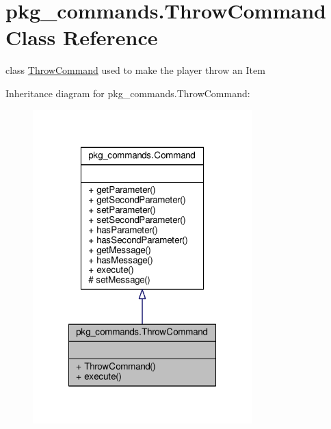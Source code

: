 \hypertarget{classpkg__commands_1_1ThrowCommand}{\section{pkg\-\_\-commands.\-Throw\-Command Class Reference}
\label{classpkg__commands_1_1ThrowCommand}
}


class \hyperlink{classpkg__commands_1_1ThrowCommand}{Throw\-Command} used to make the player throw an Item  




Inheritance diagram for pkg\-\_\-commands.\-Throw\-Command\-:
\nopagebreak
\begin{figure}[H]
\begin{center}
\leavevmode
\includegraphics[width=240pt]{classpkg__commands_1_1ThrowCommand__inherit__graph}
\end{center}
\end{figure}


